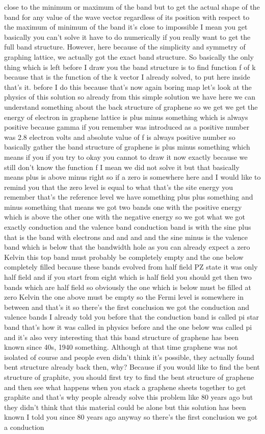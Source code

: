 close to the minimum or maximum of the band but to get the actual shape of the band for any value of the wave vector regardless of its position with respect to the maximum of minimum of the band it's close to impossible I mean you get basically you can't solve it have to do numerically if you really want to get the full band structure. However, here because of the simplicity and symmetry of graphing lattice, we actually got the exact band structure. So basically the only thing which is left before I draw you the band structure is to find function f of k because that is the function of the k vector I already solved, to put here inside that's it. before I do this because that's now again boring map let's look at the physics of this solution so already from this simple solution we have here we can understand something about the back structure of graphene so we get we get the energy of electron in graphene lattice is plus minus something which is always positive because gamma if you remember was introduced as a positive number was 2.8 electron volts and absolute value of f is always positive number so basically gather the band structure of graphene is plus minus something which means if you if you try to okay you cannot to draw it now exactly because we still don't know the function f I mean we did not solve it but that basically means plus is above minus right so if a zero is somewhere here and I would like to remind you that the zero level is equal to what that's the site energy you remember that's the reference level we have something plus plus something and minus something that means we got two bands one with the positive energy which is above the other one with the negative energy so we got what we got exactly conduction and the valence band conduction band is with the sine plus that is the band with electrons and and and and the sine minus is the valence band which is below that the bandwidth hole as you can already expect a zero Kelvin this top band must probably be completely empty and the one below completely filled because these bands evolved from half field PZ state it was only half field and if you start from eight which is half field you should get then two bands which are half field so obviously the one which is below must be filled at zero Kelvin the one above must be empty so the Fermi level is somewhere in between and that's it so there's the first conclusion we got the conduction and valence bands I already told you before that the conduction band is called pi star band that's how it was called in physics before and the one below was called pi and it's also very interesting that this band structure of graphene has been known since 40s, 1940 something. Although at that time graphene was not isolated of course and people even didn't think it's possible, they actually found bent structure already back then, why? Because if you would like to find the bent structure of graphite, you should first try to find the bent structure of graphene and then see what happens when you stack a graphene sheets together to get graphite and that's why people already solve this problem like 80 years ago but they didn't think that this material could be alone but this solution has been known I told you since 80 years ago anyway so there's the first conclusion we got a conduction 